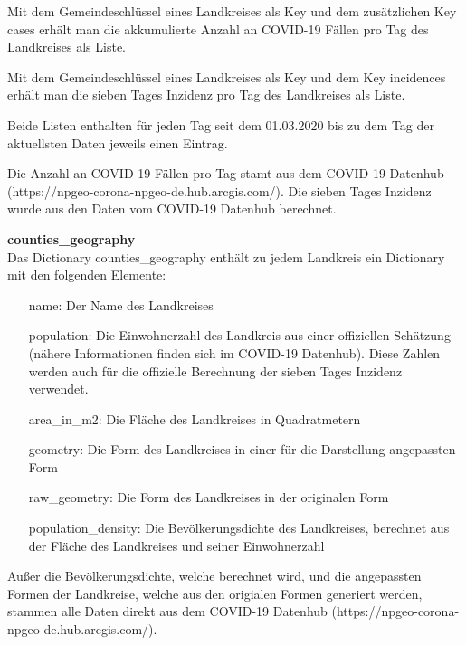 Mit dem Gemeindeschlüssel eines Landkreises als Key und dem zusätzlichen Key \glqq{}cases\grqq{} erhält man die akkumulierte Anzahl an COVID-19 Fällen pro Tag des Landkreises als Liste.

Mit dem Gemeindeschlüssel eines Landkreises als Key und dem Key \glqq{}incidences\grqq{} erhält man die sieben Tages Inzidenz pro Tag des Landkreises als Liste.

Beide Listen enthalten für jeden Tag seit dem 01.03.2020 bis zu dem Tag der aktuellsten Daten jeweils einen Eintrag.

Die Anzahl an COVID-19 Fällen pro Tag stamt aus dem \glqq{}COVID-19 Datenhub\grqq{} (https://npgeo-corona-npgeo-de.hub.arcgis.com/). Die sieben Tages Inzidenz wurde aus den Daten vom COVID-19 Datenhub berechnet.

\textbf{counties\_geography}\\
Das Dictionary counties\_geography enthält zu jedem Landkreis ein Dictionary mit den folgenden Elemente:
\begin{itemize}
    \item[name:] Der Name des Landkreises
    \item[population:] Die Einwohnerzahl des Landkreis aus einer offiziellen Schätzung (nähere Informationen finden sich im COVID-19 Datenhub). Diese Zahlen werden auch für die offizielle Berechnung der sieben Tages Inzidenz verwendet.
    \item[area\_in\_m2:] Die Fläche des Landkreises in Quadratmetern
    \item[geometry:] Die Form des Landkreises in einer für die Darstellung angepassten Form
    \item[raw\_geometry:] Die Form des Landkreises in der originalen Form
    \item[population\_density:] Die Bevölkerungsdichte des Landkreises, berechnet aus der Fläche des Landkreises und seiner Einwohnerzahl
\end{itemize}
Außer die Bevölkerungsdichte, welche berechnet wird, und die angepassten Formen der Landkreise, welche aus den origialen Formen generiert werden, stammen alle Daten direkt aus dem \glqq{}COVID-19 Datenhub\grqq{} (https://npgeo-corona-npgeo-de.hub.arcgis.com/).

